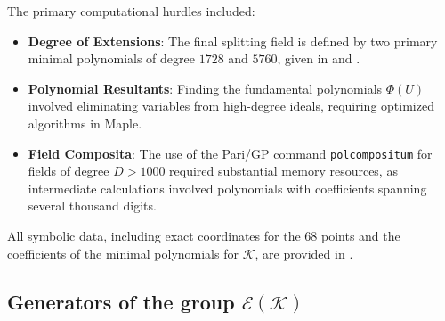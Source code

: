 \documentclass[11pt]{amsart}
\newcommand{\Ee}{{\mathcal E}}
\newcommand{\KK}{{\mathcal K}}
\numberwithin{equation}{section}
\numberwithin{table}{section}
\newcommand\<{\langle}
\begin{document}
The primary computational hurdles included:
\begin{itemize}
	\item \textbf{Degree of Extensions}: The final splitting field is defined by two primary minimal polynomials of degree $1728$ and $5760$, given in  \cite[Pol-1728]{Shioda360-Codes} and   \cite[Pol-5760]{Shioda360-Codes}.
	\item \textbf{Polynomial Resultants}: Finding the fundamental polynomials $\Phi(U)$ involved eliminating variables from high-degree ideals, requiring optimized algorithms in Maple.
	\item \textbf{Field Composita}: The use of the \textsf{Pari/GP} command \texttt{polcompositum} for fields of degree $D > 1000$ required substantial memory resources, as intermediate calculations involved polynomials with coefficients spanning several thousand digits.
\end{itemize}

All symbolic data, including exact coordinates for the $68$ points and the coefficients of the minimal polynomials for $\mathcal{K}$, are provided in \cite[Points-68]{Shioda360-Codes}.


 
 \iffalse

\subsection{Generators of the group  $\Ee(\KK)$}
\label{generatos}
 
\end{document}

